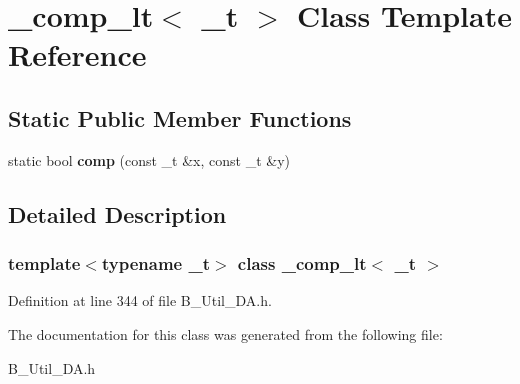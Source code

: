 \section{\_\-comp\_\-lt$<$ \_\-t $>$ Class Template Reference}
\label{class__comp__lt}
\subsection*{Static Public Member Functions}
\begin{DoxyCompactItemize}
\item 
static bool {\bfseries comp} (const \_\-t \&x, const \_\-t \&y)\label{class__comp__lt_aec999dedbbb1665449e4f63e629d23d6}

\end{DoxyCompactItemize}


\subsection{Detailed Description}
\subsubsection*{template$<$typename \_\-t$>$ class \_\-comp\_\-lt$<$ \_\-t $>$}



Definition at line 344 of file B\_\-Util\_\-DA.h.

The documentation for this class was generated from the following file:\begin{DoxyCompactItemize}
\item 
B\_\-Util\_\-DA.h\end{DoxyCompactItemize}
